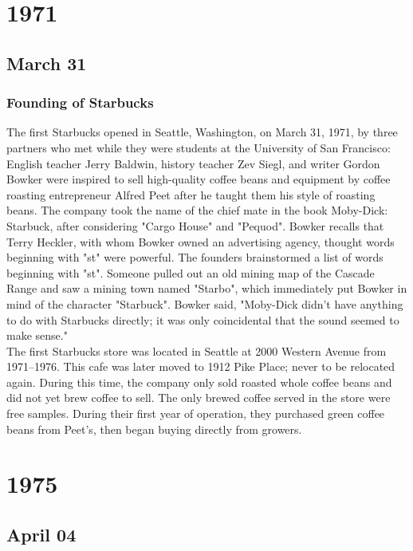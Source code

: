\documentclass[11pt]{report}
\begin{document}
\chapter{1971}
\section{March 31}
\subsection{Founding of Starbucks}
The first Starbucks opened in Seattle, Washington, on March 31, 1971, by three partners who met while they were students at the University of San Francisco: English teacher Jerry Baldwin, history teacher Zev Siegl, and writer Gordon Bowker were inspired to sell high-quality coffee beans and equipment by coffee roasting entrepreneur Alfred Peet after he taught them his style of roasting beans. The company took the name of the chief mate in the book Moby-Dick: Starbuck, after considering "Cargo House" and "Pequod". Bowker recalls that Terry Heckler, with whom Bowker owned an advertising agency, thought words beginning with "st" were powerful. The founders brainstormed a list of words beginning with "st". Someone pulled out an old mining map of the Cascade Range and saw a mining town named "Starbo", which immediately put Bowker in mind of the character "Starbuck". Bowker said, "Moby-Dick didn't have anything to do with Starbucks directly; it was only coincidental that the sound seemed to make sense."\\ \indent The first Starbucks store was located in Seattle at 2000 Western Avenue from 1971–1976. This cafe was later moved to 1912 Pike Place; never to be relocated again. During this time, the company only sold roasted whole coffee beans and did not yet brew coffee to sell. The only brewed coffee served in the store were free samples. During their first year of operation, they purchased green coffee beans from Peet's, then began buying directly from growers.

\chapter{1975}
\section{April 04}
\end{document}
